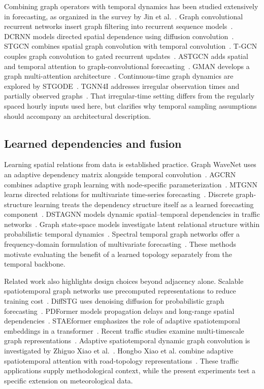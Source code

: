 \documentclass[fleqn,10pt]{wlscirep}
\begin{document}
Combining graph operators with temporal dynamics has been studied extensively in forecasting, as organized in the survey by Jin et al.~\cite{jin2023spatio}.
Graph convolutional recurrent networks insert graph filtering into recurrent sequence models~\cite{seo2018structured}.
DCRNN models directed spatial dependence using diffusion convolution~\cite{li2018diffusion}.
STGCN combines spatial graph convolution with temporal convolution~\cite{yu2018spatio}.
T-GCN couples graph convolution to gated recurrent updates~\cite{zhao2019tgcn}.
ASTGCN adds spatial and temporal attention to graph-convolutional forecasting~\cite{guo2019attention}.
GMAN develops a graph multi-attention architecture~\cite{zheng2020gman}.
Continuous-time graph dynamics are explored by STGODE~\cite{fang2021spatial}.
TGNN4I addresses irregular observation times and partially observed graphs~\cite{oskarsson2023temporal}.
That irregular-time setting differs from the regularly spaced hourly inputs used here, but clarifies why temporal sampling assumptions should accompany an architectural description.

\subsection{Learned dependencies and fusion}
Learning spatial relations from data is established practice.
Graph WaveNet uses an adaptive dependency matrix alongside temporal convolution~\cite{wu2019graph}.
AGCRN combines adaptive graph learning with node-specific parameterization~\cite{bai2020adaptive}.
MTGNN learns directed relations for multivariate time-series forecasting~\cite{wu2020connecting}.
Discrete graph-structure learning treats the dependency structure itself as a learned forecasting component~\cite{shang2021discrete}.
DSTAGNN models dynamic spatial--temporal dependencies in traffic networks~\cite{lan2022dstagnn}.
Graph state-space models investigate latent relational structure within probabilistic temporal dynamics~\cite{zambon2023graph}.
Spectral temporal graph networks offer a frequency-domain formulation of multivariate forecasting~\cite{cao2020spectral}.
These methods motivate evaluating the benefit of a learned topology separately from the temporal backbone.

Related work also highlights design choices beyond adjacency alone.
Scalable spatiotemporal graph networks use precomputed representations to reduce training cost~\cite{cini2023scalable}.
DiffSTG uses denoising diffusion for probabilistic graph forecasting~\cite{wen2023diffstg}.
PDFormer models propagation delays and long-range spatial dependencies~\cite{jiang2023pdformer}.
STAEformer emphasizes the role of adaptive spatiotemporal embeddings in a transformer~\cite{liu2023spatio}.
Recent traffic studies examine multi-timescale graph representations~\cite{chen2025multiscale}.
Adaptive spatiotemporal dynamic graph convolution is investigated by Zhiguo Xiao et al.~\cite{xiao2025adaptive}.
Hongbo Xiao et al. combine adaptive spatiotemporal attention with road-topology representations~\cite{xiao2025graph}.
These traffic applications supply methodological context, while the present experiments test a specific extension on meteorological data.
\end{document}

